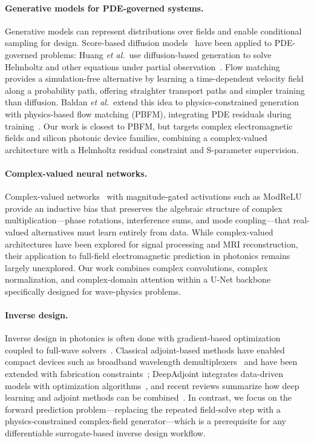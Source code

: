 \paragraph{Generative models for PDE-governed systems.}
Generative models can represent distributions over fields and enable conditional sampling for design. Score-based
diffusion models~\cite{Song2021ScoreSDE} have been applied to PDE-governed problems: Huang \emph{et al.}\ use
diffusion-based generation to solve Helmholtz and other equations under partial
observation~\cite{Huang2024DiffusionPDE}. Flow matching~\cite{Lipman2022FlowMatching} provides a simulation-free
alternative by learning a time-dependent velocity field along a probability path, offering straighter transport paths
and simpler training than diffusion. Baldan \emph{et al.}\ extend this idea to physics-constrained generation with
physics-based flow matching (PBFM), integrating PDE residuals during
training~\cite{Baldan2025PBFM}. Our work is closest to PBFM, but targets complex electromagnetic fields and silicon
photonic device families, combining a complex-valued architecture with a Helmholtz residual constraint and
S-parameter supervision.

\paragraph{Complex-valued neural networks.}
Complex-valued networks~\cite{Trabelsi2018DeepComplex} with magnitude-gated activations such as
ModReLU~\cite{Arjovsky2016UnitaryRNN} provide an inductive bias that preserves the algebraic structure of complex
multiplication---phase rotations, interference sums, and mode coupling---that real-valued alternatives must learn
entirely from data. While complex-valued architectures have been explored for signal processing and MRI
reconstruction, their application to full-field electromagnetic prediction in photonics remains largely unexplored. Our
work combines complex convolutions, complex normalization, and complex-domain attention within a U-Net backbone
specifically designed for wave-physics problems.

\paragraph{Inverse design.}
Inverse design in photonics is often done with gradient-based optimization coupled to full-wave
solvers~\cite{Molesky2018InverseDesign}. Classical adjoint-based methods have enabled compact devices such as
broadband wavelength demultiplexers~\cite{Piggott2015DemultiplexerNatPhoton} and have been extended with fabrication
constraints~\cite{Piggott2017FabricationConstrainedSciRep}; DeepAdjoint integrates data-driven models with
optimization algorithms~\cite{Yeung2022DeepAdjointArxiv}, and recent reviews summarize how deep learning and adjoint
methods can be combined~\cite{Pan2023AdjointDeepLearningReview}. In contrast, we focus on the forward prediction
problem---replacing the repeated field-solve step with a physics-constrained complex-field generator---which is a
prerequisite for any differentiable surrogate-based inverse design workflow.
